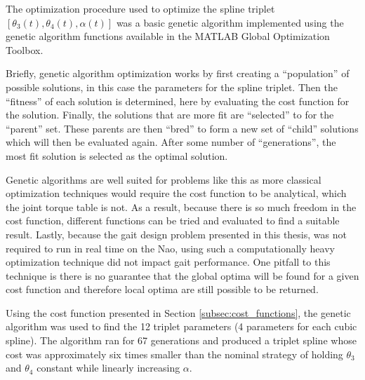 The optimization procedure used to optimize the spline triplet $[\theta_3(t), \theta_4(t), \alpha(t)]$
was a basic genetic algorithm implemented using the genetic algorithm functions available in the MATLAB 
Global Optimization Toolbox. 

Briefly, genetic algorithm optimization works by first creating a ``population'' of
possible solutions, in this case the parameters for the spline triplet. Then the ``fitness'' of each solution
is determined, here by evaluating the cost function for the solution. Finally, the solutions that are more fit
are ``selected'' to for the ``parent'' set. These parents are then ``bred'' to form a new set of ``child'' solutions
which will then be evaluated again. After some number of ``generations'', the most fit solution is selected
as the optimal solution.

Genetic algorithms are well suited for problems like this as more classical optimization techniques
would require the cost function to be analytical, which the joint torque table is not.
As a result, because there is so much freedom in the cost function, different functions can be tried
and evaluated to find a suitable result.
Lastly, because the gait design problem presented in this thesis, was not required to run in real time on the
Nao, using such a computationally heavy optimization technique did not impact gait performance.
One pitfall to this technique is there is no guarantee that the global optima will be found for
a given cost function and therefore local optima are still possible to be returned.

Using the cost function presented in Section \ref{subsec:cost_functions}, the genetic algorithm was used
to find the 12 triplet parameters (4 parameters for each cubic spline). The algorithm ran for 67 generations
and produced a triplet spline whose cost was approximately six times smaller than the nominal strategy
of holding $\theta_3$ and $\theta_4$ constant while linearly increasing $\alpha$.